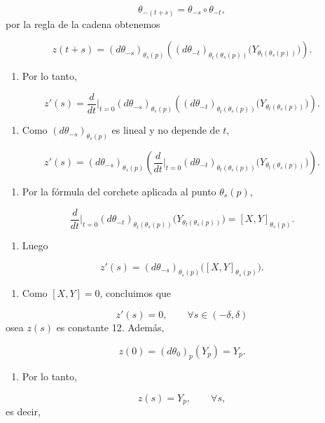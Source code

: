 \begin{bookproof}{}
\[
\theta_{-(t+s)}=\theta_{-s}\circ\theta_{-t},
\]
por la regla de la cadena obtenemos

\[
z(t+s)=(d\theta_{-s})_{\theta_s(p)}\left((d\theta_{-t})_{\theta_t(\theta_s(p))}\big(Y_{\theta_t(\theta_s(p))}\big)\right).
\]
\begin{enumerate}[start=7]
\item Por lo tanto,
\end{enumerate}
\[
z'(s)=\frac{d}{dt}\Big|_{t=0}(d\theta_{-s})_{\theta_s(p)}\left((d\theta_{-t})_{\theta_t(\theta_s(p))}\big(Y_{\theta_t(\theta_s(p))}\big)\right).
\]
\begin{enumerate}[start=8]
\item Como $(d\theta_{-s})_{\theta_s(p)}$ es lineal y no depende de $t$,
\end{enumerate}
\[
z'(s)=(d\theta_{-s})_{\theta_s(p)}\left(\frac{d}{dt}\Big|_{t=0}(d\theta_{-t})_{\theta_t(\theta_s(p))}\big(Y_{\theta_t(\theta_s(p))}\big)\right).
\]
\begin{enumerate}[start=9]
\item Por la fórmula del corchete aplicada al punto $\theta_s(p)$,
\end{enumerate}
\[
\frac{d}{dt}\Big|_{t=0}(d\theta_{-t})_{\theta_t(\theta_s(p))}\big(Y_{\theta_t(\theta_s(p))}\big)=[X,Y]_{\theta_s(p)}.
\]
\begin{enumerate}[start=10]
\item Luego
\end{enumerate}
\[
z'(s)=(d\theta_{-s})_{\theta_s(p)}\big([X,Y]_{\theta_s(p)}\big).
\]
\begin{enumerate}[start=11]
\item Como $[X,Y]=0$, concluimos que
\end{enumerate}
\[
z'(s)=0,\qquad \forall s\in (-\delta ,\delta )
\]
osea $z(s)$ es constante 12. Además,

\[
z(0)=(d\theta_0)_p(Y_p)=Y_p.
\]
\begin{enumerate}[start=13]
\item Por lo tanto,
\end{enumerate}
\[
z(s)=Y_p,\qquad \forall s,
\]
es decir,


\end{bookproof}
